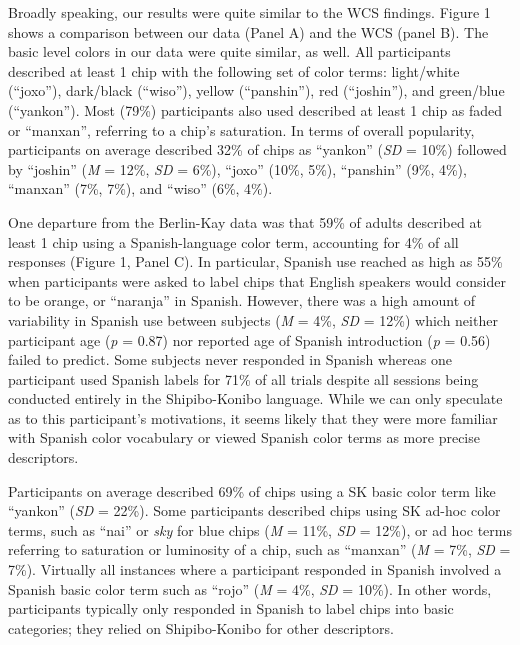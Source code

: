 \documentclass[
  english,
  ,man,floatsintext]{apa6}
\begin{document}
Broadly speaking, our results were quite similar to the WCS findings. Figure 1 shows a comparison between our data (Panel A) and the WCS (panel B). The basic level colors in our data were quite similar, as well. All participants described at least 1 chip with the following set of color terms: light/white (\enquote{joxo}), dark/black (\enquote{wiso}), yellow (\enquote{panshin}), red (\enquote{joshin}), and green/blue (\enquote{yankon}). Most (79\%) participants also used described at least 1 chip as faded or \enquote{manxan}, referring to a chip's saturation. In terms of overall popularity, participants on average described 32\% of chips as \enquote{yankon} (\emph{SD} = 10\%) followed by \enquote{joshin} (\emph{M} = 12\%, \emph{SD} = 6\%), \enquote{joxo} (10\%, 5\%), \enquote{panshin} (9\%, 4\%), \enquote{manxan} (7\%, 7\%), and \enquote{wiso} (6\%, 4\%).

One departure from the Berlin-Kay data was that 59\% of adults described at least 1 chip using a Spanish-language color term, accounting for 4\% of all responses (Figure 1, Panel C). In particular, Spanish use reached as high as 55\% when participants were asked to label chips that English speakers would consider to be orange, or \enquote{naranja} in Spanish. However, there was a high amount of variability in Spanish use between subjects (\emph{M} = 4\%, \emph{SD} = 12\%) which neither participant age (\emph{p} = 0.87) nor reported age of Spanish introduction (\emph{p} = 0.56) failed to predict. Some subjects never responded in Spanish whereas one participant used Spanish labels for 71\% of all trials despite all sessions being conducted entirely in the Shipibo-Konibo language. While we can only speculate as to this participant's motivations, it seems likely that they were more familiar with Spanish color vocabulary or viewed Spanish color terms as more precise descriptors.

Participants on average described 69\% of chips using a SK basic color term like \enquote{yankon} (\emph{SD} = 22\%). Some participants described chips using SK ad-hoc color terms, such as \enquote{nai} or \emph{sky} for blue chips (\emph{M} = 11\%, \emph{SD} = 12\%), or ad hoc terms referring to saturation or luminosity of a chip, such as \enquote{manxan} (\emph{M} = 7\%, \emph{SD} = 7\%). Virtually all instances where a participant responded in Spanish involved a Spanish basic color term such as \enquote{rojo} (\emph{M} = 4\%, \emph{SD} = 10\%). In other words, participants typically only responded in Spanish to label chips into basic categories; they relied on Shipibo-Konibo for other descriptors.
\end{document}
